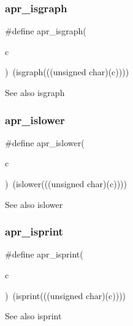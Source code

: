 \subsubsection{\texorpdfstring{apr\+\_\+isgraph}{apr\_isgraph}}
{\footnotesize\ttfamily \#define apr\+\_\+isgraph(\begin{DoxyParamCaption}\item[{}]{c }\end{DoxyParamCaption})~(isgraph(((unsigned char)(c))))}

\begin{DoxySeeAlso}{See also}
isgraph 
\end{DoxySeeAlso}
\mbox{\label{group__apr__ctype_gaff5eeb2f6350095ce86cc2cd4b1d38ee}} 
\subsubsection{\texorpdfstring{apr\+\_\+islower}{apr\_islower}}
{\footnotesize\ttfamily \#define apr\+\_\+islower(\begin{DoxyParamCaption}\item[{}]{c }\end{DoxyParamCaption})~(islower(((unsigned char)(c))))}

\begin{DoxySeeAlso}{See also}
islower 
\end{DoxySeeAlso}
\mbox{\label{group__apr__ctype_ga20da56fc8bbedc9f8a40d20c1cc58bac}} 
\subsubsection{\texorpdfstring{apr\+\_\+isprint}{apr\_isprint}}
{\footnotesize\ttfamily \#define apr\+\_\+isprint(\begin{DoxyParamCaption}\item[{}]{c }\end{DoxyParamCaption})~(isprint(((unsigned char)(c))))}

\begin{DoxySeeAlso}{See also}
isprint 
\end{DoxySeeAlso}
\mbox{\label{group__apr__ctype_ga1db14e8d5f9891010c8bad08aa100674}} 
